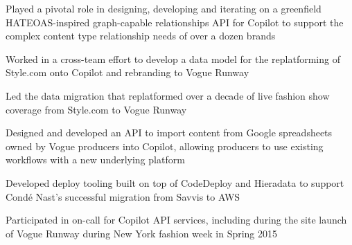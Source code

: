 \begin{job}

  \item Played a pivotal role in designing, developing and iterating on a
    greenfield HATEOAS-inspired graph-capable relationships API for Copilot to
    support the complex content type relationship needs of over a dozen brands
  \item Worked in a cross-team effort to develop a data model for the
    replatforming of Style.com onto Copilot and rebranding to Vogue Runway
  \item Led the data migration that replatformed over a decade of live fashion
  show coverage from Style.com to Vogue Runway
  \item Designed and developed an API to import content from Google spreadsheets
    owned by Vogue producers into Copilot, allowing producers to use existing
    workflows with a new underlying platform
  \item Developed deploy tooling built on top of CodeDeploy and Hieradata to
    support Cond\'{e} Nast's successful migration from Savvis to AWS
  \item Participated in on-call for Copilot API services, including during the
    site launch of Vogue Runway during New York fashion week in Spring 2015
\end{job}
